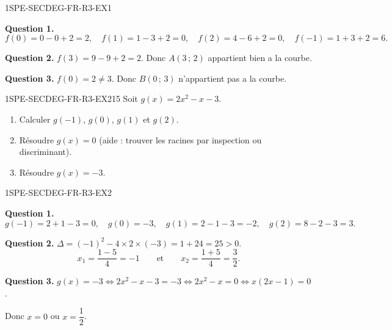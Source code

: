 \begin{corrige}{1SPE-SECDEG-FR-R3-EX1}


\textbf{Question 1.}
\[
f(0) = 0 - 0 + 2 = 2, \quad f(1) = 1 - 3 + 2 = 0, \quad f(2) = 4 - 6 + 2 = 0, \quad f(-1) = 1 + 3 + 2 = 6.
\]


\textbf{Question 2.} $f(3) = 9 - 9 + 2 = 2$. Donc $A(3\,;\,2)$ appartient bien a la courbe. \checkmark

\textbf{Question 3.} $f(0) = 2
\neq 3$. Donc $B(0\,;\,3)$ n'appartient pas a la courbe.

\end{corrige}


\begin{exercice}{1SPE-SECDEG-FR-R3-EX2}{1}{5}
Soit $g(x) = 2x^2 - x - 3$.
\begin{enumerate}
  \item Calculer $g(-1)$, $g(0)$, $g(1)$ et $g(2)$.
  \item Résoudre $g(x) = 0$ (aide : trouver les racines par inspection ou discriminant).
  \item Résoudre $g(x) = -3$.
\end{enumerate}
\end{exercice}


\begin{corrige}{1SPE-SECDEG-FR-R3-EX2}

\textbf{Question 1.}
\[
g(-1) = 2 + 1 - 3 = 0, \quad g(0) = -3, \quad g(1) = 2 - 1 - 3 = -2, \quad g(2) = 8 - 2 - 3 = 3.
\]


\textbf{Question 2.} $\Delta = (-1)^2 - 4 \times 2 \times (-3) = 1 + 24 = 25 > 0$.
\[
x_1 = \frac{1 - 5}{4} = -1 \qquad \text{et} \qquad x_2 = \frac{1 + 5}{4} = \frac{3}{2}.
\]

\textbf{Question 3.} $g(x) = -3 \Leftrightarrow 2x^2 - x - 3 = -3 \Leftrightarrow 2x^2 - x = 0 \Leftrightarrow x(2x-1) = 0$.

Donc $x = 0$ ou $x = \dfrac{1}{2}$.

\end{corrige}

